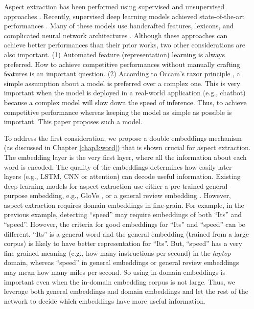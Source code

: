 Aspect extraction has been performed using supervised \cite{Jakob2010,chernyshevich2014ihs,shu2017lifelong} and unsupervised approaches \cite{HuL2004,ZhuangJZ2006,MeiLWSZ2007,QiuLBC2011,yin2016unsupervised,he2017unsupervised}. 
Recently, supervised deep learning models achieved state-of-the-art performances \cite{li2017deep}. Many of these models use handcrafted features, lexicons, and complicated neural network architectures \cite{poria2016aspect,wang2016recursive,wang2017coupled,li2017deep}. 
Although these approaches can achieve better performances than their prior works, two other considerations are also important.
(1) Automated feature (representation) learning is always preferred. 
How to achieve competitive performances without manually crafting features is an important question. 
(2) According to Occam's razor principle \cite{blumer1987occam}, a simple assumption about a model is preferred over a complex one.
This is very important when the model is deployed in a real-world application (e.g., chatbot) because a complex model will slow down the speed of inference. Thus, to achieve competitive performance whereas keeping the model as simple as possible is important. This paper proposes such a model. 

To address the first consideration, we propose a double embeddings mechanism (as discussed in Chapter \ref{chap3:word}) that is shown crucial for aspect extraction.
The embedding layer is the very first layer, where all the information about each word is encoded.
The quality of the embeddings determines how easily later layers (e.g., LSTM, CNN or attention) can decode useful information.
Existing deep learning models for aspect extraction use either a pre-trained general-purpose embedding, e.g., GloVe \cite{pennington2014glove}, or a general review embedding \cite{poria2016aspect}.
However, aspect extraction requires domain embeddings in fine-grain.
For example, in the previous example, detecting ``speed'' may require embeddings of both ``Its'' and ``speed''.
However, the criteria for good embeddings for ``Its'' and ``speed'' can be different.
``Its'' is a general word and the general embedding (trained from a large corpus) is likely to have better representation for ``Its''.
But, ``speed'' has a very fine-grained meaning (e.g., how many instructions per second) in the \textit{laptop} domain, whereas ``speed'' in general embeddings or general review embeddings may mean how many miles per second.
So using in-domain embeddings is important even when the in-domain embedding corpus is not large. 
Thus, we leverage both general embeddings and domain embeddings and let the rest of the network to decide which embeddings have more useful information.

